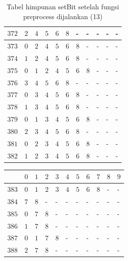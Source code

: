 \begin{appendices}
\begin{table}[H]
\begin{tabular} {|l|l|l|l|l|l|l|l|l|l|l|}
  		$ 372 $ & $ 2 $ &$ 4 $ &$ 5 $ &$ 6 $ &$ 8 $ & - &  - &  - &  - &  -   \\ \hline
  		$ 373 $ & $ 0 $ &$ 2 $ &$ 4 $ &$ 5 $ &$ 6 $ &$ 8 $ & - &  - &  - &  -   \\ \hline
  		$ 374 $ & $ 1 $ &$ 2 $ &$ 4 $ &$ 5 $ &$ 6 $ &$ 8 $ & - &  - &  - &  -   \\ \hline
  		$ 375 $ & $ 0 $ &$ 1 $ &$ 2 $ &$ 4 $ &$ 5 $ &$ 6 $ &$ 8 $ & - &  - &  -   \\ \hline
  		$ 376 $ & $ 3 $ &$ 4 $ &$ 5 $ &$ 6 $ &$ 8 $ & - &  - &  - &  - &  -   \\ \hline
  		$ 377 $ & $ 0 $ &$ 3 $ &$ 4 $ &$ 5 $ &$ 6 $ &$ 8 $ & - &  - &  - &  -   \\ \hline
  		$ 378 $ & $ 1 $ &$ 3 $ &$ 4 $ &$ 5 $ &$ 6 $ &$ 8 $ & - &  - &  - &  -   \\ \hline
  		$ 379 $ & $ 0 $ &$ 1 $ &$ 3 $ &$ 4 $ &$ 5 $ &$ 6 $ &$ 8 $ & - &  - &  -   \\ \hline
  		$ 380 $ & $ 2 $ &$ 3 $ &$ 4 $ &$ 5 $ &$ 6 $ &$ 8 $ & - &  - &  - &  -   \\ \hline
  		$ 381 $ & $ 0 $ &$ 2 $ &$ 3 $ &$ 4 $ &$ 5 $ &$ 6 $ &$ 8 $ & - &  - &  -   \\ \hline
  		$ 382 $ & $ 1 $ &$ 2 $ &$ 3 $ &$ 4 $ &$ 5 $ &$ 6 $ &$ 8 $ & - &  - &  -   \\ \hline
  	\end{tabular}\caption{Tabel himpunan setBit setelah fungsi preprocess dijalankan (13)}
  	\label{tab:setbit_13}
  \end{table}
  \begin{table}[H]
  	\centering
  	\begin{tabular} {|l|l|l|l|l|l|l|l|l|l|l|} \hline
  		\backslashbox{$Num$}{$index$} & $ 0 $ & $ 1 $ & $ 2 $ & $ 3 $ & $ 4 $ & $ 5 $ & $ 6 $ & $ 7 $ & $ 8 $ & $ 9 $ \\ \hline
  		$ 383 $ & $ 0 $ &$ 1 $ &$ 2 $ &$ 3 $ &$ 4 $ &$ 5 $ &$ 6 $ &$ 8 $ & - &  -   \\ \hline
  		$ 384 $ & $ 7 $ &$ 8 $ & - &  - &  - &  - &  - &  - &  - &  -   \\ \hline
  		$ 385 $ & $ 0 $ &$ 7 $ &$ 8 $ & - &  - &  - &  - &  - &  - &  -   \\ \hline
  		$ 386 $ & $ 1 $ &$ 7 $ &$ 8 $ & - &  - &  - &  - &  - &  - &  -   \\ \hline
  		$ 387 $ & $ 0 $ &$ 1 $ &$ 7 $ &$ 8 $ & - &  - &  - &  - &  - &  -   \\ \hline
  		$ 388 $ & $ 2 $ &$ 7 $ &$ 8 $ & - &  - &  - &  - &  - &  - &  -   \\ \hline

\end{tabular}
\end{table}
\end{appendices}
